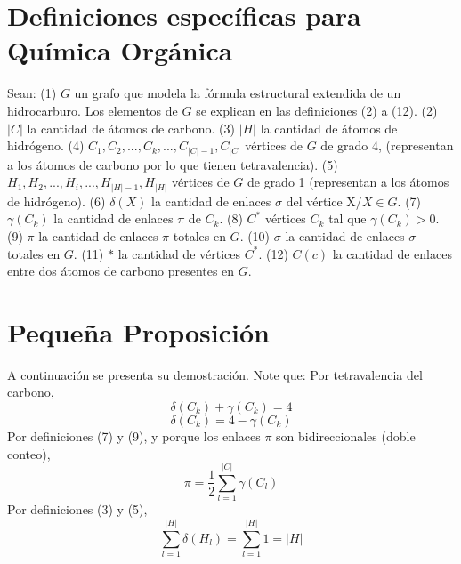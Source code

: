 \documentclass{article}
\begin{document}
\section{Definiciones específicas para Química Orgánica}
Sean:\newline
(1) $G$ un grafo que modela la fórmula estructural extendida de un hidrocarburo. Los elementos de $G$ se explican en las definiciones (2) a (12).\newline
(2) $|C|$ la cantidad de átomos de carbono.\newline
(3) $|H|$ la cantidad de átomos de hidrógeno.\newline
(4) $C_1,C_2,...,C_k,...,C_{|C|-1},C_{|C|}$  vértices de $G$ de grado 4, (representan a los átomos de carbono por lo que tienen tetravalencia).\newline
(5) $H_1,H_2,...,H_i,...,H_{|H|-1},H_{|H|}$ vértices de $G$ de grado 1 (representan a los átomos de hidrógeno).\newline
(6) $\delta(X)$ la cantidad de enlaces $\sigma$ del vértice X/$X \in G$. \newline
(7) $\gamma(C_k)$ la cantidad de enlaces $\pi$ de $C_k$. \newline
(8) $C^*$  vértices $C_k$ tal que $\gamma(C_k)>0$. \newline
(9) $\pi$ la cantidad de enlaces $\pi$ totales en $G$.\newline
(10) $\sigma$ la cantidad de enlaces $\sigma$ totales en $G$.\newline
(11) $*$ la cantidad de vértices $C^*$.\newline
(12) $C(c)$ la cantidad de enlaces entre dos átomos de carbono presentes en $G$.\newline

\section{Pequeña Proposición}
\newtheorem{myteo2}{Teorema} 
\begin{center} 
\end{center}
A continuación se presenta su demostración.\newline\newline
Note que:\newline\newline
Por tetravalencia del carbono,
$$\delta(C_k)+\gamma(C_k)=4$$
\begin{equation}
\delta(C_k)=4-\gamma(C_k)
\end{equation}\newline
Por definiciones (7) y (9), y porque los enlaces $\pi$ son bidireccionales (doble conteo),
\begin{equation}
\pi=\frac{1}{2}\sum_{l=1}^{|C|}\gamma(C_l)
\end{equation}
Por definiciones (3) y (5),
\begin{equation}
\sum_{l=1}^{|H|}\delta(H_l)=\sum_{l=1}^{|H|}1=|H|
\end{equation}
\end{document}
